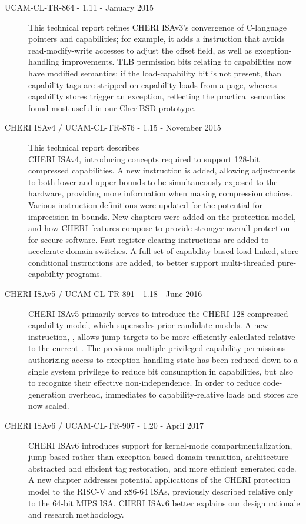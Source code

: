 \begin{description}
\item[UCAM-CL-TR-864 - 1.11 - January 2015]
  This technical report refines CHERI ISAv3's convergence of C-language
  pointers and capabilities; for example, it adds a 
  instruction that avoids read-modify-write accesses to adjust the offset
  field, as well as exception-handling improvements.
  TLB permission bits relating to capabilities now have modified semantics:
  if the load-capability bit is not present, than capability tags are stripped
  on capability loads from a page, whereas capability stores trigger an
  exception, reflecting the practical semantics found most useful in our
  CheriBSD prototype.

\item[CHERI ISAv4 / UCAM-CL-TR-876 - 1.15 - November 2015]
  This technical report describes \\
  CHERI ISAv4, introducing concepts required
  to support 128-bit compressed capabilities.
  A new  instruction is added, allowing adjustments
  to both lower and upper bounds to be simultaneously exposed to the hardware,
  providing more information when making compression choices.
  Various instruction definitions were updated for the potential for
  imprecision in bounds.
  New chapters were added on the protection model, and how CHERI features
  compose to provide stronger overall protection for secure software.
  Fast register-clearing instructions are added to accelerate domain switches.
  A full set of capability-based load-linked, store-conditional instructions
  are added, to better support multi-threaded pure-capability programs.

\item[CHERI ISAv5 / UCAM-CL-TR-891 - 1.18 - June 2016]
  CHERI ISAv5 primarily serves to introduce the CHERI-128 compressed
  capability model, which supersedes prior candidate models.
  A new instruction, , allows jump targets to
  be more efficiently calculated relative to the current \PCC{}.
  The previous multiple privileged capability permissions authorizing access
  to exception-handling state has been reduced down to a single system
  privilege to reduce bit consumption in capabilities, but also to recognize
  their effective non-independence.
  In order to reduce code-generation overhead, immediates to
  capability-relative loads and stores are now scaled.

\item[CHERI ISAv6 / UCAM-CL-TR-907 - 1.20 - April 2017]
  CHERI ISAv6 introduces support for kernel-mode compartmentalization,
  jump-based rather than exception-based domain transition,
  architecture-abstracted and efficient tag restoration, and more efficient
  generated code.
  A new chapter addresses potential applications of the CHERI protection model
  to the RISC-V and x86-64 ISAs, previously described relative only to the
  64-bit MIPS ISA.
  CHERI ISAv6 better explains our design rationale and research methodology.


\end{description}

